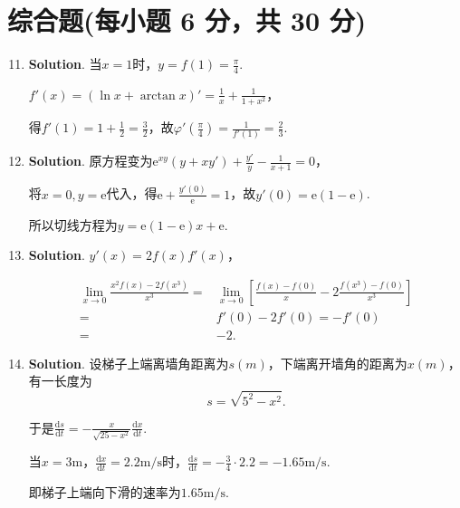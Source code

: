 \documentclass[../Main.tex]{subfiles}
\begin{document}
\section{综合题(每小题 6 分，共 30 分)}
\begin{enumerate}
    \setcounter{enumi}{10}
    \item \textbf{Solution}. 当$x=1$时，$y=f(1)=\frac{\pi}{4}$.

          $f'(x)=\left(\ln x+\arctan x\right)'=\frac{1}{x}+\frac{1}{1+x^{2}}$，

          得$f'(1)=1+\frac{1}{2}=\frac{3}{2}$，故$\varphi'\left(\frac{\pi}{4}\right)=
              \frac{1}{f'(1)}=\frac{2}{3}$.

    \item \textbf{Solution}. 原方程变为$\mathrm{e}^{xy}(y+xy')+\frac{y'}{y}-
              \frac{1}{x+1}=0$，

          将$x=0,y=\mathrm{e}$代入，得$\mathrm{e}+\frac{y'(0)}{\mathrm{e}}=1$，故$y'(
              0)=\mathrm{e}(1-\mathrm{e})$.

          所以切线方程为$y=\mathrm{e}(1-\mathrm{e})x+\mathrm{e}$.

    \item \textbf{Solution}. $y'(x)=2f(x)f'(x)$，

          \[
              \begin{aligned}
                  \lim_{x\to0}\frac{x^2f(x)-2f(x^3)}{x^3}= & \lim_{x\to0}\left[\frac{f(x)-f(0)}{x}-2\frac{f(x^3)-f(0)}{x^3}\right] \\
                  =                                        & f'(0)-2f'(0)=-f'(0)                                                   \\
                  =                                        & -2.
              \end{aligned}
          \]

    \item \textbf{Solution}. 设梯子上端离墙角距离为$s(m)$，下端离开墙角的距离为$x
              (m)$，有一长度为
          \[
              s=\sqrt{5^{2}-x^{2}}.
          \]

          于是$\frac{\mathrm{d}s}{\mathrm{d}t}=-\frac{x}{\sqrt{25-x^{2}}}\frac{\mathrm{d}x}{\mathrm{d}t}$.

          当$x=3\mathrm{m}$，$\frac{\mathrm{d}x}{\mathrm{d}t}=2.2\mathrm{m/s}$时，$\frac{\mathrm{d}s}{\mathrm{d}t}
              =-\frac{3}{4}\cdot2.2=-1.65\mathrm{m/s}$.

          即梯子上端向下滑的速率为$1.65\mathrm{m/s}$.


\end{enumerate}
\end{document}
